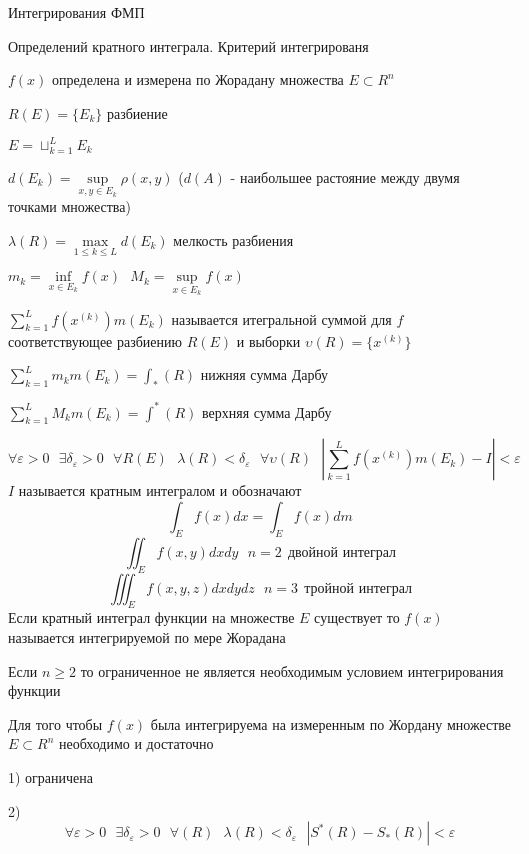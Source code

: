 \begin{title}
  Интегрирования ФМП
\end{title}

\begin{title}[\Large]
  Определений кратного интеграла. Критерий интегрированя
\end{title}

\begin{block}[Обозначения]
  $f(x)$ определена и измерена по Жорадану множества $E \subset R^n$

  $R(E) = \{E_k\}$ разбиение

  $E = \sqcup_{k=1}^L E_k$

  $d(E_k) = \sup \limits_{x,y \in E_k} \rho(x,y)$ ($d(A)$ - наибольшее
  растояние между двумя точками множества)

  $\lambda(R) = \max \limits_{1 \le k \le L} d(E_k)$ мелкость разбиения

  $m_k = \inf \limits_{x \in E_k} f(x) ~~~ M_k = \sup \limits_{x \in E_k} f(x)$

  $\sum_{k=1}^L f(x^{(k)}) m(E_k)$ называется итегральной суммой для $f$
  соответствующее разбиению $R(E)$ и выборки $\upsilon(R) = \{x^{(k)}\}$

  $\sum_{k=1}^L m_k m(E_k) = \int_* (R)$ нижняя сумма Дарбу

  $\sum_{k=1}^L M_k m(E_k) = \int^* (R)$ верхняя сумма Дарбу
\end{block}

\begin{define}
  $$
  \forall \varepsilon > 0 ~~~ \exists \delta_{\varepsilon} > 0 ~~~
  \forall R(E) ~~~ \lambda(R) < \delta_{\varepsilon} ~~~
  \forall \upsilon(R) ~~~ \left| \sum_{k=1}^L f(x^{(k)}) m(E_k) - I \right|
  < \varepsilon
  $$
  $I$ называется кратным интегралом и обозначают
  $$
  \int_E f(x) dx = \int_E f(x) dm
  $$
  $$
  \iint_E f(x,y) dxdy ~~~ n = 2 ~~ \text{двойной интеграл}
  $$
  $$
  \iiint_E f(x,y,z) dxdydz ~~~ n = 3 ~~ \text{тройной интеграл}
  $$
  Если кратный интеграл функции на множестве $E$ существует то $f(x)$
  называется интегрируемой по мере Жорадана

  Если $n \ge 2$ то ограниченное не является необходимым условием
  интегрирования функции
\end{define}

\begin{block}
  Для того чтобы $f(x)$ была интегрируема на измеренным по Жордану множестве
  $E \subset R^n$ необходимо и достаточно

  1) ограничена

  2)
  $$
  \forall \varepsilon > 0 ~~~ \exists \delta_{\varepsilon} > 0 ~~~ \forall(R)
  ~~~ \lambda(R) < \delta_{\varepsilon} ~~~ \left| S^*(R) - S_*(R) \right| <
  \varepsilon
  $$
\end{block}

